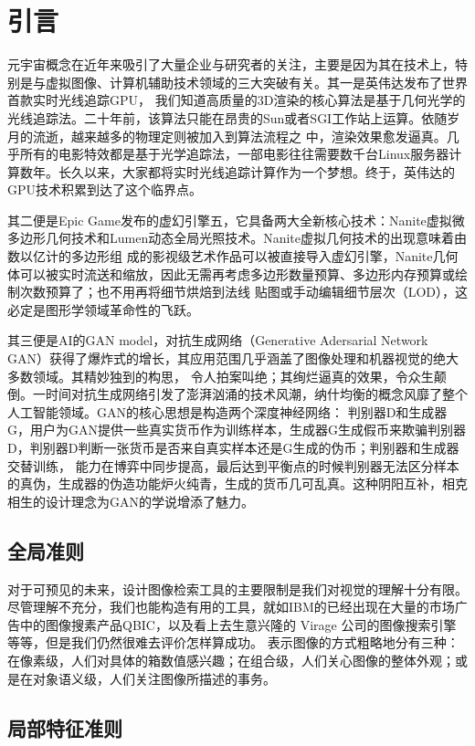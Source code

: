 \section{引言}

元宇宙概念在近年来吸引了大量企业与研究者的关注，主要是因为其在技术上，特别是与虚拟图像、计算机辅助技术领域的三大突破有关。其一是英伟达发布了世界首款实时光线追踪GPU，
我们知道高质量的3D渲染的核心算法是基于几何光学的光线追踪法。二十年前，该算法只能在昂贵的Sun或者SGI工作站上运算。依随岁月的流逝，越来越多的物理定则被加入到算法流程之
中，渲染效果愈发逼真。几乎所有的电影特效都是基于光学追踪法，一部电影往往需要数千台Linux服务器计算数年。长久以来，大家都将实时光线追踪计算作为一个梦想。终于，英伟达的GPU技术积累到达了这个临界点。

其二便是Epic Game发布的虚幻引擎五，它具备两大全新核心技术：Nanite虚拟微多边形几何技术和Lumen动态全局光照技术。Nanite虚拟几何技术的出现意味着由数以亿计的多边形组
成的影视级艺术作品可以被直接导入虚幻引擎，Nanite几何体可以被实时流送和缩放，因此无需再考虑多边形数量预算、多边形内存预算或绘制次数预算了；也不用再将细节烘焙到法线
贴图或手动编辑细节层次（LOD），这必定是图形学领域革命性的飞跃。

其三便是AI的GAN model，对抗生成网络（Generative Adersarial Network GAN）获得了爆炸式的增长，其应用范围几乎涵盖了图像处理和机器视觉的绝大多数领域。其精妙独到的构思，
令人拍案叫绝；其绚烂逼真的效果，令众生颠倒。一时间对抗生成网络引发了澎湃汹涌的技术风潮，纳什均衡的概念风靡了整个人工智能领域。GAN的核心思想是构造两个深度神经网络：
判别器D和生成器G，用户为GAN提供一些真实货币作为训练样本，生成器G生成假币来欺骗判别器D，判别器D判断一张货币是否来自真实样本还是G生成的伪币；判别器和生成器交替训练，
能力在博弈中同步提高，最后达到平衡点的时候判别器无法区分样本的真伪，生成器的伪造功能炉火纯青，生成的货币几可乱真。这种阴阳互补，相克相生的设计理念为GAN的学说增添了魅力。

\subsection{全局准则}

对于可预见的未来，设计图像检索工具的主要限制是我们对视觉的理解十分有限。尽管理解不充分，我们也能构造有用的工具，就如IBM的已经出现在大量的市场广告中的图像搜素产品QBIC，以及看上去生意兴隆的
Virage 公司的图像搜索引擎等等，但是我们仍然很难去评价怎样算成功。
表示图像的方式粗略地分有三种：在像素级，人们对具体的箱数值感兴趣；在组合级，人们关心图像的整体外观；或是在对象语义级，人们关注图像所描述的事务。

\subsection{局部特征准则}


